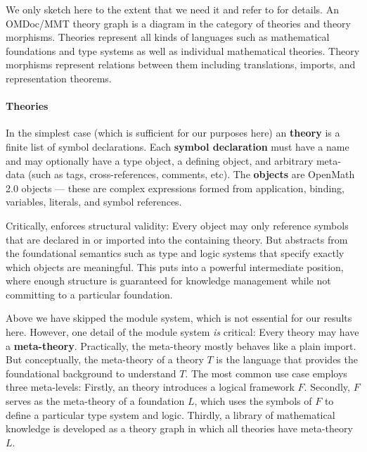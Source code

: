 We only sketch \MMT here to the extent that we need it and refer to \cite{RabKoh:WSMSML13} for details.
An OMDoc/MMT theory graph is a diagram in the category of \MMT theories and theory morphisms.
Theories represent all kinds of languages such as mathematical foundations and type systems as well as individual mathematical theories.
Theory morphisms represent relations between them including translations, imports, and representation theorems.

\paragraph{Theories}
In the simplest case (which is sufficient for our purposes here) an \MMT \textbf{theory} is a finite list of symbol declarations.
Each \textbf{symbol declaration} must have a name and may optionally have a type object, a defining object, and arbitrary meta-data (such as tags, cross-references, comments, etc).
The \textbf{objects} are OpenMath 2.0 objects \cite{BusCapCar:2oms04} --- these are complex expressions formed from application, binding, variables, literals, and symbol references.

Critically, \MMT enforces structural validity: Every object may only reference symbols that are declared in or imported into the containing theory.
But \MMT abstracts from the foundational semantics such as type and logic systems that specify exactly which objects are meaningful.
This puts \MMT into a powerful intermediate position, where enough structure is guaranteed for knowledge management while not committing to a particular foundation.

Above we have skipped the \MMT module system, which is not essential for our results here.
However, one detail of the \MMT module system \emph{is} critical: Every theory may have a \textbf{meta-theory}.
Practically, the meta-theory mostly behaves like a plain import.
But conceptually, the meta-theory of a theory $T$ is the language that provides the foundational background to understand $T$.
The most common use case employs three meta-levels: Firstly, an \MMT theory introduces a logical framework $F$.
Secondly, $F$ serves as the meta-theory of a foundation $L$, which uses the symbols of $F$ to define a particular type system and logic.
Thirdly, a library of mathematical knowledge is developed as a theory graph in which all theories have meta-theory $L$.

